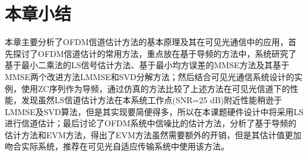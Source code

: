 \section{本章小结}
本章主要分析了OFDM信道估计方法的基本原理及其在可见光通信中的应用，首先探讨了OFDM信道估计的常用方法，重点放在基于导频的方法中，系统研究了基于最小二乘法的LS信号估计方法、基于最小均方误差的MMSE方法及其基于MMSE两个改进方法LMMSE和SVD分解方法；然后结合可见光通信系统设计的实例，使用ZC序列作为导频，通过仿真的方法比较了上述方法在可见光信道下的性能，发现虽然LS信道估计方法在本系统工作点(SNR=25 dB)附近性能稍逊于LMMSE及SVD算法，但是其实现要简便得多，所以在本课题硬件设计中将采用LS进行信道估计；最后讨论了OFDM系统中信噪比的估计方法，分析了基于导频的估计方法和EVM方法，得出了EVM方法虽然需要额外的开销，但是其估计值更加吻合实际系统，推荐在可见光自适应传输系统中使用该方法。